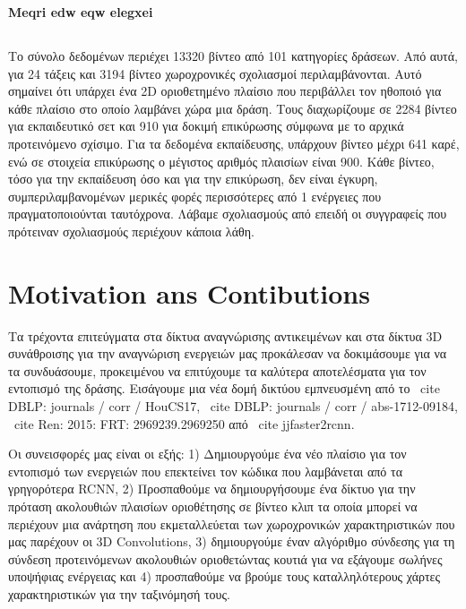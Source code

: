 \textbf{Meqri edw eqw elegxei}
\subsection{}
Το σύνολο δεδομένων  περιέχει 13320 βίντεο από 101 κατηγορίες δράσεων.
Από αυτά, για 24 τάξεις και 3194 βίντεο χωροχρονικές σχολιασμοί περιλαμβάνονται. Αυτό σημαίνει ότι υπάρχει ένα 2D οριοθετημένο πλαίσιο που περιβάλλει τον ηθοποιό για κάθε πλαίσιο στο οποίο λαμβάνει χώρα μια δράση.
Τους διαχωρίζουμε σε 2284 βίντεο για εκπαιδευτικό σετ και 910 για δοκιμή επικύρωσης σύμφωνα με το
αρχικά προτεινόμενο σχίσιμο. Για τα δεδομένα εκπαίδευσης, υπάρχουν βίντεο μέχρι 641 καρέ, ενώ σε στοιχεία επικύρωσης ο μέγιστος αριθμός πλαισίων είναι 900.
Κάθε βίντεο, τόσο για την εκπαίδευση όσο και για την επικύρωση, δεν είναι έγκυρη, συμπεριλαμβανομένων μερικές φορές περισσότερες από 1 ενέργειες που πραγματοποιούνται ταυτόχρονα.
Λάβαμε σχολιασμούς από  επειδή οι συγγραφείς που πρότειναν σχολιασμούς περιέχουν κάποια λάθη.

\section{Motivation ans Contibutions}
Τα τρέχοντα επιτεύγματα στα δίκτυα αναγνώρισης αντικειμένων και στα δίκτυα 3D συνάθροισης για την αναγνώριση ενεργειών μας προκάλεσαν να δοκιμάσουμε
για να τα συνδυάσουμε, προκειμένου να επιτύχουμε τα καλύτερα αποτελέσματα για τον εντοπισμό της δράσης. Εισάγουμε μια νέα δομή δικτύου εμπνευσμένη από το
\ cite {DBLP: journals / corr / HouCS17}, \ cite {DBLP: journals / corr / abs-1712-09184}, \ cite {Ren: 2015: FRT: 2969239.2969250}
από \ cite {jjfaster2rcnn}.

Οι συνεισφορές μας είναι οι εξής: 1) Δημιουργούμε ένα νέο πλαίσιο για τον εντοπισμό των ενεργειών που επεκτείνει τον κώδικα που λαμβάνεται από τα γρηγορότερα RCNN,
2) Προσπαθούμε να δημιουργήσουμε ένα δίκτυο για την πρόταση ακολουθιών πλαισίων οριοθέτησης σε βίντεο κλιπ τα οποία μπορεί να περιέχουν μια ανάρτηση που εκμεταλλεύεται
των χωροχρονικών χαρακτηριστικών που μας παρέχουν οι 3D Convolutions, 3) δημιουργούμε έναν αλγόριθμο σύνδεσης για τη σύνδεση προτεινόμενων ακολουθιών
οριοθετώντας κουτιά για να εξάγουμε σωλήνες υποψήφιας ενέργειας και 4) προσπαθούμε να βρούμε τους καταλληλότερους χάρτες χαρακτηριστικών για την ταξινόμησή τους.
